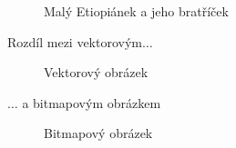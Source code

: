 \documentclass[11pt]{article}
\begin{document}
\begin{figure}[h]
{    }
    \caption{Malý Etiopiánek a jeho bratříček}
    \label{obr1}
\end{figure}
\newpage

\quad Rozdíl mezi vektorovým$\ldots$

\begin{figure}[ht]
    \centering
    \caption{Vektorový obrázek}
    \label{obr2}
\end{figure}
$\ldots$ a bitmapovým obrázkem
\begin{figure}[ht]
    \centering
    \caption{Bitmapový obrázek}
    \label{obr3}
\end{figure}
\end{document}
